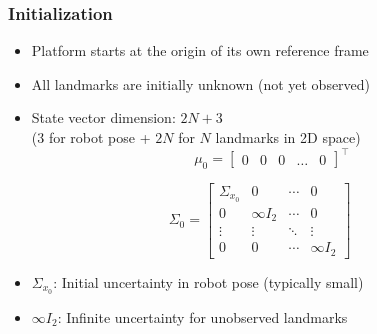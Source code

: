 \begin{frame}
    \frametitle{Initialization}

    \begin{itemize}
        \item Platform starts at the origin of its own reference frame
        \item All landmarks are initially unknown (not yet observed)
        \item State vector dimension: $2N + 3$ \\
        (3 for robot pose + $2N$ for $N$ landmarks in 2D space)
        \begin{equation*}
            \mu_0 =
            \begin{bmatrix}
                0 & 0 & 0 & \dots & 0    
            \end{bmatrix}^{\top}
        \end{equation*}
    \end{itemize}
    
    \begin{equation*}
        \Sigma_0 =
        \begin{bmatrix}
            \Sigma_{x_0} & 0 & \cdots & 0 \\
            0 & \infty I_{2} & \cdots & 0 \\
            \vdots & \vdots & \ddots & \vdots \\
            0 & 0 & \cdots & \infty I_{2}
        \end{bmatrix}
    \end{equation*}
    
    \begin{itemize}
        \item $\Sigma_{x_0}$: Initial uncertainty in robot pose (typically small)
        \item $\infty I_{2}$: Infinite uncertainty for unobserved landmarks
    \end{itemize}
\end{frame}


